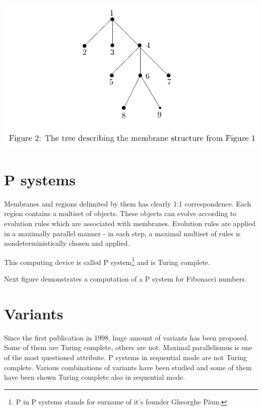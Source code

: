 \documentclass[myposter,portrait]{sciposter}
\def\mysection#1{
{\color{sectionCol}\section*{\sc\bfseries #1}}}
\begin{document}
\begin{multicols*}{3}

\includegraphics[width=\columnwidth]{membrane_tree}

\mysection{P systems}

Membranes and regions delimited by them has clearly 1:1 correspondence. Each region contains a multiset of objects. These objects can evolve according to evolution rules which are associated with membranes. Evolution rules are applied in a maximally parallel manner - in each step, a maximal multiset of rules is nondeterministically chosen and applied.

This computing device is called P system\footnote{P in P systems stands for surname of it's founder Gheorghe P\u aun.} and is Turing complete.

Next figure demonstrates a computation of a P system for Fibonacci numbers.

\mysection{Variants}

Since the first publication in 1998, huge amount of variants has been proposed. Some of them are Turing complete, others are not. Maximal parallelismus is one of the most questioned attribute. P systems in sequential mode are not Turing complete. Various combinations of variants have been studied and some of them have been shown Turing complete also in sequential mode.


\end{multicols*}
\end{document}
